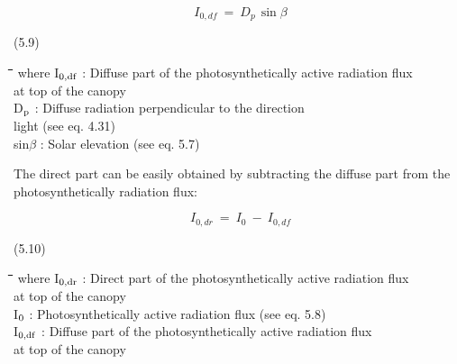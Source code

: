 \documentclass[11pt]{article}
\begin{document}
\begin{displaymath}
I _{0,df} ~=~ D _{p~} \sin \beta
\end{displaymath}

\bigskip
\strut\hfill (5.9)\nwln
\begin{tabbing}
\hspace{1.27cm}\=\hspace{1.27cm}\=\hspace{1.27cm}\=\hspace{1.27cm}\=%
\hspace{1.27cm}\=\hspace{1.27cm}\=\hspace{1.27cm}\=\hspace{1.27cm}\=%
\hspace{1.27cm}\=\hspace{1.27cm}\=\kill
where\> I$_{{\rm 0,df}}$\> : Diffuse part of the photosynthetically active radiation flux \\
\>\>   at top of the canopy\> \> \> \> \> \> \> \> [J m$^{{\rm -2}}$ s$^{{\rm -1}}$]\\
\>D$_{{\rm p}}$\> : Diffuse radiation perpendicular to the direction \\
\>\>   light (see eq. 4.31)\> \> \> \> \> \> \> \> [J m$^{{\rm -2}}$ s$^{{\rm -1}}$]\\
\>sin$\beta$\> : Solar elevation (see eq. 5.7)\> \> \> \> \> \> \> \> [degrees]
\end{tabbing}

\bigskip
\bigskip
The direct part can be easily obtained by subtracting the diffuse part from the
{\nobreak}photosynthetically radiation flux:

\begin{displaymath}
I _{0,dr} ~=~ I _{0} ~-~I _{0,df} 
\end{displaymath}

 \bigskip
\strut\hfill (5.10)
\nwln
\begin{tabbing}
\hspace{1.27cm}\=\hspace{1.27cm}\=\hspace{1.27cm}\=\hspace{1.27cm}\=%
\hspace{1.27cm}\=\hspace{1.27cm}\=\hspace{1.27cm}\=\hspace{1.27cm}\=%
\hspace{1.27cm}\=\hspace{1.27cm}\=\kill
where\> I$_{{\rm 0,dr}}$\> : Direct part of the photosynthetically active radiation flux \\
\>\>   at top of the canopy\> \> \> \> \> \> \> \> [J m$^{{\rm -2}}$ s$^{{\rm -1}}$]\\
\>I$_{{\rm 0}}$\> : Photosynthetically active radia\-tion flux (see eq. 5.8)\> \> \> \> \> \> \> \> [J m$^{{\rm -2}}$ s$^{{\rm -1}}$]\\
\>I$_{{\rm 0,df}}$\> : Diffuse part of the photosynthetically active radiation flux \\
\>\>   at top of the canopy\> \> \> \> \> \> \> \> [J m$^{{\rm -2}}$ s$^{{\rm -1}}$]
\end{tabbing}
\end{document}

